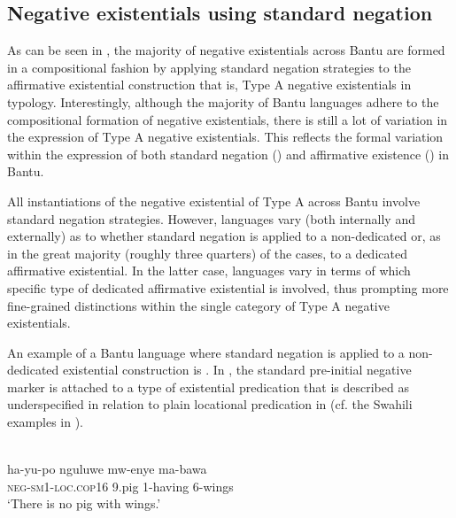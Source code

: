 \documentclass[output=paper,draft,draftmode,colorlinks,citecolor=brown]{langscibook}
\begin{document}
\subsection{Negative existentials using standard negation}\label{sec:1:5.1}
As can be seen in , the majority of negative 
existentials across Bantu are formed in a compositional fashion by applying 
standard negation strategies to the affirmative existential construction \textemdash that is, Type A negative existentials in  typology. Interestingly, although the majority of Bantu languages adhere to the compositional formation of negative existentials, there is still a lot of variation in the expression of Type A negative existentials. This reflects the formal variation within the expression of both standard negation () and affirmative existence () in Bantu.

All instantiations of the negative existential of Type A across Bantu involve standard negation strategies. However, languages vary (both internally and externally) as to whether standard negation is applied to a non-dedicated or, as in the great majority (roughly three quarters) of the cases, to a dedicated affirmative existential. In the latter case, languages vary in terms of which specific type of dedicated affirmative existential is involved, thus prompting more fine-grained distinctions within the single category of Type A negative existentials.

An example of a Bantu language where standard negation is applied to a
non-dedicated existential construction is . In
, the standard pre-initial negative marker is attached
to a type of existential predication that is described as underspecified
in relation to plain locational predication in  (cf. the
Swahili examples in ).

\ea\label{ex:swahili-pig} \\
\gll ha-yu-po nguluwe mw-enye ma-bawa\\ \textsc{neg-sm1-loc.cop16} 9.pig
1-having 6-wings\\
\glt `There is no pig with wings.'
\z
\end{document}
